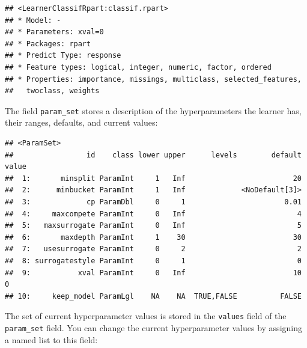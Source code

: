 \documentclass[]{scrbook}
\newenvironment{Shaded}{\begin{snugshade}}{\end{snugshade}}
\newcommand{\DataTypeTok}[1]{\textcolor[rgb]{0.13,0.29,0.53}{#1}}
\newcommand{\DecValTok}[1]{\textcolor[rgb]{0.00,0.00,0.81}{#1}}
\newcommand{\FloatTok}[1]{\textcolor[rgb]{0.00,0.00,0.81}{#1}}
\newcommand{\KeywordTok}[1]{\textcolor[rgb]{0.13,0.29,0.53}{\textbf{#1}}}
\newcommand{\NormalTok}[1]{#1}
\newcommand{\OperatorTok}[1]{\textcolor[rgb]{0.81,0.36,0.00}{\textbf{#1}}}
\newcommand{\StringTok}[1]{\textcolor[rgb]{0.31,0.60,0.02}{#1}}
\renewenvironment{Shaded} {\begin{snugshade}\small} {\end{snugshade}}
\begin{document}
\begin{verbatim}
## <LearnerClassifRpart:classif.rpart>
## * Model: -
## * Parameters: xval=0
## * Packages: rpart
## * Predict Type: response
## * Feature types: logical, integer, numeric, factor, ordered
## * Properties: importance, missings, multiclass, selected_features,
##   twoclass, weights
\end{verbatim}

The field \texttt{param\_set} stores a description of the hyperparameters the learner has, their ranges, defaults, and current values:

\begin{Shaded}
\end{Shaded}

\begin{verbatim}
## <ParamSet>
##                 id    class lower upper      levels        default value
##  1:       minsplit ParamInt     1   Inf                         20      
##  2:      minbucket ParamInt     1   Inf             <NoDefault[3]>      
##  3:             cp ParamDbl     0     1                       0.01      
##  4:     maxcompete ParamInt     0   Inf                          4      
##  5:   maxsurrogate ParamInt     0   Inf                          5      
##  6:       maxdepth ParamInt     1    30                         30      
##  7:   usesurrogate ParamInt     0     2                          2      
##  8: surrogatestyle ParamInt     0     1                          0      
##  9:           xval ParamInt     0   Inf                         10     0
## 10:     keep_model ParamLgl    NA    NA  TRUE,FALSE          FALSE
\end{verbatim}

The set of current hyperparameter values is stored in the \texttt{values} field of the \texttt{param\_set} field.
You can change the current hyperparameter values by assigning a named list to this field:

\begin{Shaded}
\end{Shaded}
\end{document}
